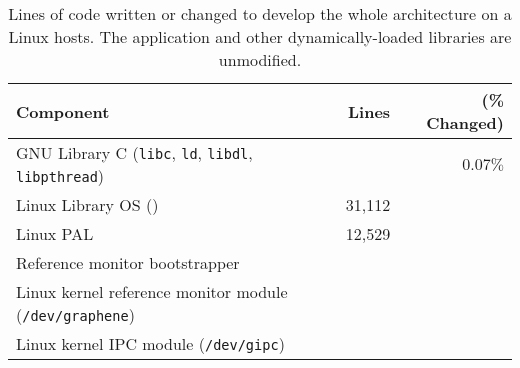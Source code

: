 \begin{table}[t!b!]
\footnotesize
\centering
\begin{tabular}{|l|rr|}
\hline
{\bf Component} & {\bf Lines} & ({\bf \% Changed})\\
\hline
GNU Library C ({\tt libc}, {\tt ld}, {\tt libdl}, {\tt libpthread}) & \libclines{} & $0.07\%$ \\
\hline
Linux Library OS (\thelibos{}) & 31,112 & \\
Linux PAL & 12,529 & \\
\hline
Reference monitor bootstrapper & {} & \\
Linux kernel reference monitor module ({\tt /dev/graphene}) & \sandboxmodlines{} & \\
Linux kernel IPC module ({\tt /dev/gipc}) & \gipclines{} & \\
\hline
\end{tabular}
\caption{Lines of code written or changed to develop the whole \graphene{} architecture on a Linux hosts.  The application and other dynamically-loaded libraries are unmodified.}
\label{tab:libos:loc}
\end{table}









